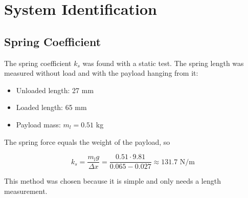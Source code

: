 
\section{System Identification}\label{sec:ident}

\subsection{Spring Coefficient}
The spring coefficient $k_s$ was found with a static test. The spring
length was measured without load and with the payload hanging from it:

\begin{itemize}
  \item Unloaded length: 27 mm
  \item Loaded length: 65 mm
  \item Payload mass: $m_l = 0.51$ kg
\end{itemize}

The spring force equals the weight of the payload, so

\begin{equation}
  k_s = \frac{m_l g}{\Delta x} = \frac{0.51 \cdot 9.81}{0.065 - 0.027}
  \approx 131.7 \text{ N/m}
\end{equation}

This method was chosen because it is simple and only needs a length measurement.

